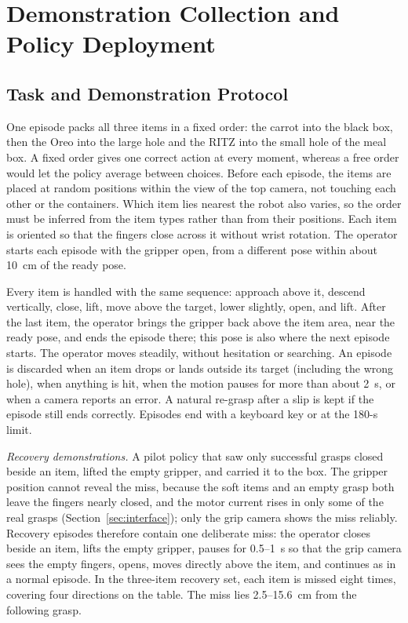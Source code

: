 \section{Demonstration Collection and Policy Deployment}
\label{sec:workflow}

\subsection{Task and Demonstration Protocol}
\label{sec:protocol}
One episode packs all three items in a fixed order: the carrot into the black
box, then the Oreo into the large hole and the RITZ into the small hole of the
meal box. A fixed order gives one correct action at every moment, whereas a
free order would let the policy average between choices. Before each episode,
the items are placed at random positions within the view of the top camera,
not touching each other or the containers. Which item lies nearest the robot
also varies, so the order must be inferred from the item types rather than from
their positions. Each item is oriented so that the fingers close across it
without wrist rotation. The operator starts each episode with the gripper
open, from a different pose within about 10~cm of the ready pose.

Every item is handled with the same sequence: approach above it, descend
vertically, close, lift, move above the target, lower slightly, open, and
lift. After the last item, the operator brings the gripper back above the
item area, near the ready pose, and ends the episode there; this pose is also
where the next episode starts. The operator moves steadily, without hesitation or searching. An episode is
discarded when an item drops or lands outside its target (including the wrong
hole), when anything is hit, when the motion pauses for more than about 2~s,
or when a camera reports an error. A natural re-grasp after a slip is kept
if the episode still ends correctly. Episodes end with a keyboard key or at
the 180-s limit.

\emph{Recovery demonstrations.}
A pilot policy that saw only successful grasps closed beside an item, lifted
the empty gripper, and carried it to the box. The gripper position cannot
reveal the miss, because the soft items and an empty grasp both leave the
fingers nearly closed, and the motor current rises in only some of the real
grasps (Section~\ref{sec:interface}); only the grip camera shows the miss
reliably. Recovery episodes
therefore contain one deliberate miss: the operator closes beside an item,
lifts the empty gripper, pauses for 0.5--1~s so that the grip camera sees the
empty fingers, opens, moves directly above the item, and continues as in a
normal episode. In the three-item recovery set, each item is missed eight times,
covering four directions on the table. The miss lies 2.5--15.6~cm from the
following grasp.

